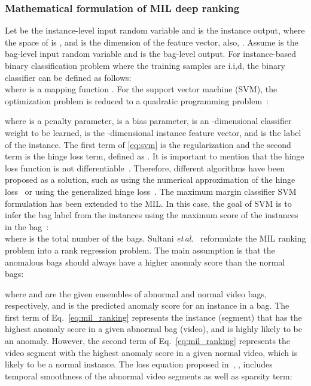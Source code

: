 \documentclass[journal]{IEEEtran}
\newcommand{\authorcite}{{\textit{et}\,\textit{al}.}}
\begin{document}
\subsubsection{Mathematical formulation of MIL deep ranking}
Let  be the instance-level input random variable and  is the instance output, where the space of  is , and  is the dimension of the feature vector, also, . Assume  is the bag-level input random variable and  is the bag-level output. For instance-based binary classification problem where the training samples are i.i,d, the binary classifier can be defined as follows:\\

where  is a mapping function . 
For the support vector machine (SVM), the optimization problem is reduced to a quadratic programming problem~\cite{suykens1999least}:

where  is a penalty parameter,  is a bias parameter,  is an -dimensional classifier weight to be learned,  is the -dimensional instance feature vector,  and  is the label of the instance. The first term of \eqref{eq:svm} is the  regularization and the second term is the hinge loss term, defined as . It is important to mention that the hinge loss function is not differentiable~\cite{yakhnenko2011multi}. Therefore, different algorithms have been proposed as a solution, such as using the numerical approximation of the hinge loss~\cite{loeff2008scene} or using the generalized hinge loss~\cite{amit2007uncovering}. The maximum margin classifier SVM formulation has been extended to the MIL. In this case, the goal of SVM is to infer the bag label from the instances using the maximum score of the instances in the bag~\cite{andrews2003support}:\\

where  is the total number of the bags.
Sultani \authorcite~\cite{sultani2018real} reformulate the MIL ranking problem into a rank regression problem. The main assumption is that the anomalous bags should always have a higher anomaly score than the normal bags:

where  and  are the given ensembles of abnormal and normal video bags, respectively, and  is the predicted anomaly score for an instance in a bag. The first term of Eq.~\eqref{eq:mil_ranking} represents the instance (segment) that has the highest anomaly score in a given abnormal bag (video), and is highly likely to be an anomaly. However, the second term of Eq.~\eqref{eq:mil_ranking} represents the video segment with the highest anomaly score in a given normal video, which is likely to be a normal instance. The loss equation proposed in~\cite{sultani2018real}, , includes temporal smoothness of the abnormal video segments as well as sparsity term:
\end{document}
